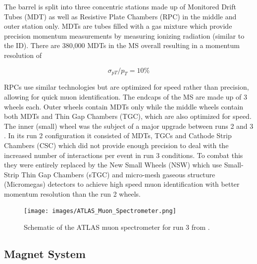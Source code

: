 The barrel is split into three concentric stations made up of Monitored Drift Tubes (MDT) as well as Resistive Plate 
Chambers (RPC) in the middle and outer station only. MDTs are tubes filled with a gas mixture which provide precision 
momentum measurements by measuring ionizing radiation (similar to the ID). There are 380,000 MDTs in the MS overall 
resulting in a momentum resolution of 

\begin{equation} %
\sigma_{pT}/p_T = 10\%
\end{equation}

RPCs use similar technologies but are optimized for speed rather than precision, allowing for quick muon identification. 
The endcaps of the MS are made up of 3 wheels each. Outer wheels contain MDTs only while the middle wheels contain both 
MDTs and Thin Gap Chambers (TGC), which are also optimized for speed. The inner (small) wheel was the subject of a major 
upgrade between runs 2 and 3 \cite{atlas-run3-setup}. In its run 2 configuration it consisted of MDTs, TGCs and Cathode 
Strip Chambers (CSC) which did not provide enough precision to deal with the increased number of interactions per event 
in run 3 conditions. To combat this they were entirely replaced by the New Small Wheels (NSW) which use Small-Strip Thin 
Gap Chambers (sTGC) and micro-mesh gaseous structure (Micromegas) detectors to achieve high speed muon identification 
with better momentum resolution than the run 2 wheels. \par

\begin{figure}
\centering
    \texttt{[image: images/ATLAS\_Muon\_Spectrometer.png]}
    \caption{Schematic of the ATLAS muon spectrometer for run 3 from \cite{atlas-run3-setup}.}
    \label{fig:ATLAS_Muon_Spectrometer}
\end{figure}

\subsection{Magnet System}

